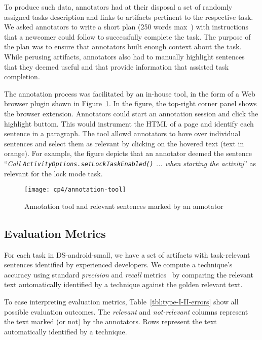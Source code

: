To produce such data, annotators had  at their disposal a set of randomly assigned tasks description and links to artifacts pertinent to the respective task. We asked annotators to write a short plan (250 words max~\cite{Rastkar2010}) with instructions that a newcomer could follow to successfully complete the task. 
The purpose of the plan was to ensure that annotators built enough context about the task.
While perusing artifacts, annotators also had to manually highlight sentences that they deemed useful and that provide information that assisted task completion. 


The annotation process was facilitated by an in-house tool, in the form of a Web browser plugin shown in Figure~\ref{fig:corpus-annotation-tool}. In the figure, the top-right corner panel shows the browser extension. Annotators could start an annotation session and click the highlight buttom.
This would instrument the HTML of a page and identify each sentence in a paragraph. The tool allowd annotators to hove over individual sentences and select them as relevant by clicking on the hovered text (text in orange). For example, the figure depicts that an annotator deemed the sentence
``\textit{Call {\small \texttt{ActivityOptions.setLockTaskEnabled()}} ... when starting the activity}'' as relevant for the lock mode task.


\begin{figure}
    \centering
    \texttt{[image: cp4/annotation-tool]}
    \caption{Annotation tool and relevant sentences marked by an annotator}
    \label{fig:corpus-annotation-tool}
\end{figure}



\subsection{Evaluation Metrics}

For each task in \acs{DS-android-small}, we have a set of artifacts with task-relevant sentences identified by experienced developers. We  
compute a technique's accuracy using standard \textit{precision} and \textit{recall} metrics~\cite{Manning2009IR} by comparing the relevant text automatically identified by a technique
against the golden relevant text.



To ease interpreting evaluation metrics, Table~\ref{tbl:type-I-II-errors} show all possible evaluation outcomes. The \textit{relevant} and \textit{not-relevant} columns represent the text 
marked (or not) by the annotators. Rows represent the text automatically identified by a technique.




